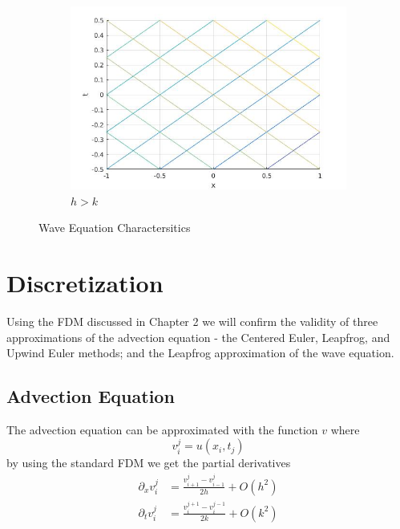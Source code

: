 \begin{figure}[H]
\begin{subfigure}[b]{0.3\textwidth}
  \includegraphics[width=\textwidth]{Images/wave_hgk.jpg}
  \caption{$h>k$}
  \label{fig:wci3}
\end{subfigure}
\caption{Wave Equation Charactersitics}
\label{fig:wavecoordimg}
\end{figure}
\section{Discretization}
Using the FDM discussed in Chapter 2 we will confirm the validity of three approximations of the advection equation - the Centered Euler, Leapfrog, and Upwind Euler methods; and the Leapfrog approximation of the wave equation.
\subsection{Advection Equation}
The advection equation can be approximated with the function $v$ where
\begin{equation}
v_i^j = u(x_i,t_j)
\end{equation}
by using the standard FDM we get the partial derivatives
\begin{align}
    \partial_xv_i^j &= \frac{v_{i+1}^j - v_{i-1}^j}{2h} + O(h^2)\label{advfdmx} \\
    \partial_tv_i^j &= \frac{v_i^{j+1} - v_i^{j-1}}{2k} + O(k^2)\label{advfdmt}
\end{align}
